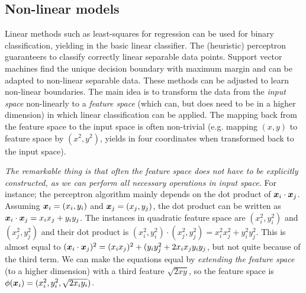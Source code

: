 \subsection{Non-linear models}\label{non-linear}
Linear methods such as least-squares for regression can be used for binary classification, yielding in the basic linear classifier.
The (heuristic) perceptron guaranteers to classify correctly linear separable data points.
Support vector machines find the unique decision boundary with maximum margin and can be adapted to non-linear separable data.
These methods can be adjusted to learn non-linear boundaries.
The main idea is to transform the data from the \emph{input space} non-linearly to a \emph{feature space} (which can, but does need to be in a higher dimension) in which linear classification can be applied.
The mapping back from the feature space to the input space is often non-trivial (e.g. mapping $(x,y)$ to feature space by $(x^2, y^2)$, yields in four coordinates when transformed back to the input space).

\emph{The remarkable thing is that often the feature space does not have to be explicitly constructed, as we can perform all necessary operations in input space.}
For instance; the perceptron algorithm mainly depends on the dot product of $\vectorsym{x}_i \cdot \vectorsym{x}_j$.
Assuming $\vectorsym{x}_i = (x_i, y_i)$ and $\vectorsym{x}_j = (x_j, y_j)$, the dot product can be written as $\vectorsym{x}_i \cdot \vectorsym{x}_j = x_i x_j + y_i y_j$.
The instances in quadratic feature space are $(x_i^2, y_i^2)$ and $(x_j^2, y_j^2)$ and their dot product is $(x_i^2, y_i^2) \cdot (x_j^2, y_j^2) = x_i^2 x_j^2 + y_i^2 y_j^2$.
This is almost equal to $(\vectorsym{x}_i \cdot \vectorsym{x}_j)^2 = (x_i x_j)^2 + (y_i y_j^2 + 2 x_i x_j y_i y_j$, but not quite because of the third term.
We can make the equations equal by \emph{extending the feature space} (to a higher dimension) with a third feature $\sqrt{2xy}$, so the feature space is $\phi(\vectorsym{x}_i) = (x_i^2, y_i^2, \sqrt{2x_i y_i})$.


